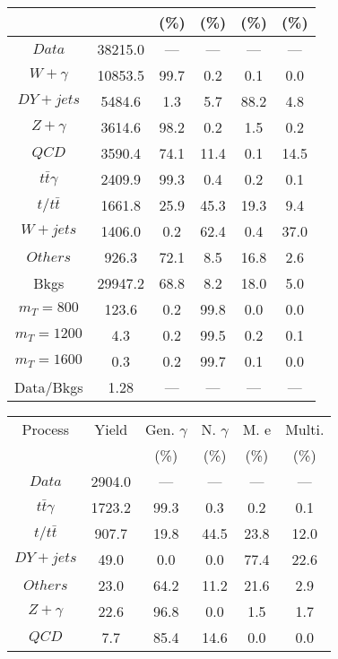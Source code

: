 \begin{figure}
\begin{minipage}[c]{0.32\textwidth}
{\begin{tabular}{cccccc}
 &  & (\%) & (\%) & (\%) & (\%)  \\
\hline
                                                                      $ Data $ &  38215.0 &  --- &  --- &  --- &  ---\\
$ W+\gamma $ &  10853.5 &  99.7 &  0.2 &  0.1 &  0.0\\
$ DY+jets $ &  5484.6 &  1.3 &  5.7 &  88.2 &  4.8\\
$ Z+\gamma $ &  3614.6 &  98.2 &  0.2 &  1.5 &  0.2\\
$ QCD $ &  3590.4 &  74.1 &  11.4 &  0.1 &  14.5\\
$ t\bar{t}\gamma $ &  2409.9 &  99.3 &  0.4 &  0.2 &  0.1\\
$ t/t\bar{t} $ &  1661.8 &  25.9 &  45.3 &  19.3 &  9.4\\
$ W+jets $ &  1406.0 &  0.2 &  62.4 &  0.4 &  37.0\\
$ Others $ &  926.3 &  72.1 &  8.5 &  16.8 &  2.6\\
Bkgs &  29947.2 &  68.8 &  8.2 &  18.0 &  5.0\\
$ m_{T} = 800 $ &  123.6 &  0.2 &  99.8 &  0.0 &  0.0\\
$ m_{T} = 1200 $ &  4.3 &  0.2 &  99.5 &  0.2 &  0.1\\
$ m_{T} = 1600 $ &  0.3 &  0.2 &  99.7 &  0.1 &  0.0\\
Data/Bkgs &  1.28 &  --- &  --- &  --- &  ---\\
\hline
\end{tabular}
}
\end{minipage}
\begin{minipage}[c]{0.32\textwidth}
\centering
\tiny{
\begin{tabular}{cccccc}
\hline
Process & Yield & Gen. $\gamma$ & N. $\gamma$ & M. e & Multi. \\
 &  & (\%) & (\%) & (\%) & (\%)  \\
\hline
                                                                      $ Data $ &  2904.0 &  --- &  --- &  --- &  ---\\
$ t\bar{t}\gamma $ &  1723.2 &  99.3 &  0.3 &  0.2 &  0.1\\
$ t/t\bar{t} $ &  907.7 &  19.8 &  44.5 &  23.8 &  12.0\\
$ DY+jets $ &  49.0 &  0.0 &  0.0 &  77.4 &  22.6\\
$ Others $ &  23.0 &  64.2 &  11.2 &  21.6 &  2.9\\
$ Z+\gamma $ &  22.6 &  96.8 &  0.0 &  1.5 &  1.7\\
$ QCD $ &  7.7 &  85.4 &  14.6 &  0.0 &  0.0\\

\end{tabular}}
\end{minipage}
\end{figure}
